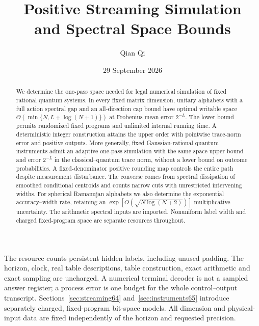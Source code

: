 \documentclass[11pt]{amsart}
\title[Positive simulation and spectral space bounds]{Positive Streaming Simulation\\and Spectral Space Bounds}
\author{Qian Qi}
\date{29 September 2026}
\numberwithin{equation}{section}
\theoremstyle{definition}\newtheorem{definition}[theorem]{Definition}
\theoremstyle{remark}\newtheorem{remark}[theorem]{Remark}
\begin{document}
\begin{abstract}
We determine the one-pass space needed for legal numerical simulation
of fixed rational quantum systems. In every fixed matrix dimension,
unitary alphabets with a full action spectral gap and an all-direction
cap bound have optimal writable space
$\Theta(\min\{N,L+\log(N+1)\})$ at Frobenius mean error $2^{-L}$.
The lower bound permits randomized fixed programs and unlimited
internal running time. A deterministic integer construction attains
the upper order with pointwise trace-norm error and positive outputs.
More generally, fixed Gaussian-rational quantum instruments admit
an adaptive one-pass simulation with the same space upper bound
and error $2^{-L}$ in the classical--quantum trace norm, without
a lower bound on outcome probabilities. A fixed-denominator positive
rounding map controls the entire path despite measurement disturbance.
The converse comes from spectral dissipation of smoothed conditional
centroids and counts narrow cuts with unrestricted intervening widths.
For spherical Ramanujan alphabets we also determine the exponential
accuracy--width rate, retaining an
$\exp[O(\sqrt{N\log(N+2)})]$ multiplicative uncertainty.
The arithmetic spectral inputs are imported.
Nonuniform label width and charged fixed-program space are separate
resources throughout.
\end{abstract}
\maketitle
\noindent The resource counts persistent hidden labels, including unused
padding. The horizon, clock, real table descriptions, table construction,
exact arithmetic and exact sampling are uncharged. A numerical terminal
decoder is not a sampled answer register; a process error is one budget
for the whole control--output transcript. Sections~\ref{sec:streaming64} and~\ref{sec:instruments65}
introduce separately charged, fixed-program bit-space models.
All dimension and physical-input data are fixed independently of the
horizon and requested precision.
























\end{document}
